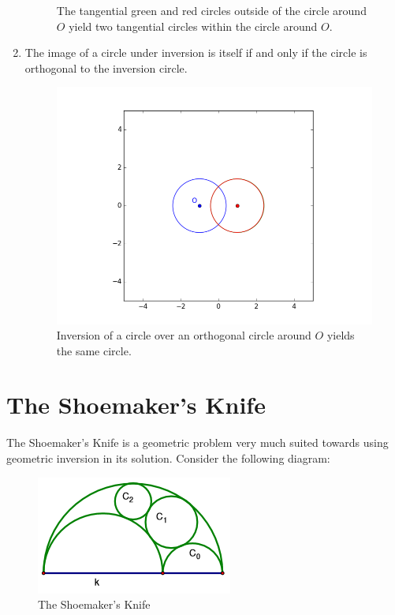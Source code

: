 \documentclass[a4paper,12pt]{article}
\numberwithin{figure}{section}
\begin{document}
\begin{enumerate}[leftmargin=25mm,label=\textbf{Theorem \arabic*:}]
\begin{figure}[H]
                \caption{The tangential green and red circles outside of the circle around $O$ yield two tangential circles within the circle around $O$.}
                \label{fig:cangle}
            \end{figure}
            \item The image of a circle under inversion is itself if and only if the circle is orthogonal to the inversion circle.
            \begin{figure}[H]
                \centering
                \includegraphics[scale=0.6]{./pictures/INVERT_CIRCLE_ORTHO}
                \caption{Inversion of a circle over an orthogonal circle around $O$ yields the same circle.}
                \label{fig:cortho}
            \end{figure}
        \end{enumerate}
        
    \section{The Shoemaker's Knife}
    
        The Shoemaker's Knife is a geometric problem very much suited towards using geometric inversion in its solution. Consider the following diagram:
        
        \begin{figure}[H]
            \centering
            \includegraphics{./pictures/SHOEMAKER_KNIFE}
            \caption{The Shoemaker's Knife}
            \label{fig:knife}
        \end{figure}
        
\end{document}
